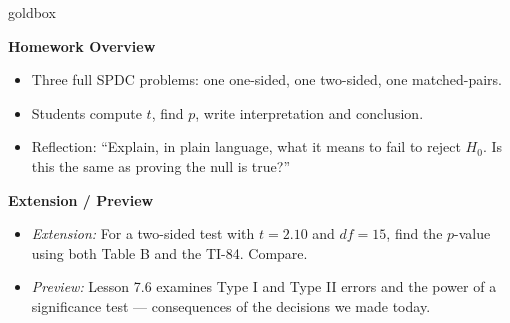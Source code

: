 \documentclass[10pt]{article}
\begin{document}
\begin{skillbox}{goldbox}
\begin{minipage}[t]{0.48\linewidth}
    \textbf{Homework Overview}
    \begin{itemize}
        \item Three full SPDC problems: one one-sided, one two-sided, one matched-pairs.
        \item Students compute $t$, find $p$, write interpretation and conclusion.
        \item Reflection: ``Explain, in plain language, what it means to fail to reject
              $H_0$. Is this the same as proving the null is true?''
    \end{itemize}
\end{minipage}
\hfill
\begin{minipage}[t]{0.48\linewidth}
    \textbf{Extension / Preview}
    \begin{itemize}
        \item \textit{Extension:} For a two-sided test with $t = 2.10$ and $df = 15$,
              find the $p$-value using both Table B and the TI-84. Compare.
        \item \textit{Preview:} Lesson 7.6 examines Type I and Type II errors and the
              power of a significance test --- consequences of the decisions we made today.
    \end{itemize}
\end{minipage}
\end{skillbox}
\end{document}
